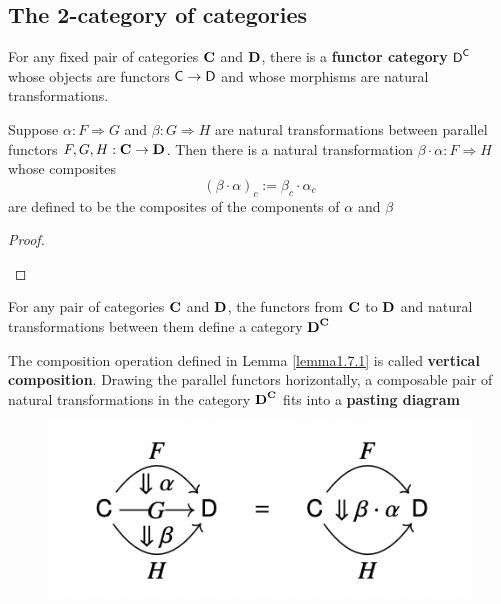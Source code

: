 \documentclass[11pt]{article}
\begin{document}
\subsection{The 2-category of categories}
\label{sec:org9f86850}
For any fixed pair of categories \(\operatorname{\textbf{C}}\) and \(\operatorname{\textbf{D}}\), there is a \textbf{functor category} \(\textsf{D}^{\textsf{C}}\)
whose objects are functors \(\textsf{C}\to\textsf{D}\) and whose morphisms are natural transformations.

\begin{lemma}
\label{lemma1.7.1}
Suppose \(\alpha:F\Rightarrow G\) and \(\beta:G\Rightarrow H\) are natural transformations between parallel
functors \(F,G,H:\operatorname{\textbf{C}}\to\operatorname{\textbf{D}}\). Then there is a natural transformation \(\beta\cdot\alpha:F\Rightarrow H\) whose composites
\begin{equation*}
(\beta\cdot\alpha)_c:=\beta_c\cdot\alpha_c
\end{equation*}
are defined to be the composites of the components of \(\alpha\) and \(\beta\)
\end{lemma}

\begin{proof}
\begin{center}\end{center}
\end{proof}

\begin{corollary}[]
For any pair of categories \(\operatorname{\textbf{C}}\) and \(\operatorname{\textbf{D}}\), the functors from \(\operatorname{\textbf{C}}\) to \(\operatorname{\textbf{D}}\) and natural
transformations between them define a category \(\operatorname{\textbf{D}}^{\operatorname{\textbf{C}}}\)
\end{corollary}

The composition operation defined in Lemma \ref{lemma1.7.1} is called \textbf{vertical composition}.
Drawing the parallel functors horizontally, a composable pair of natural transformations in the
category \(\operatorname{\textbf{D}}^{\operatorname{\textbf{C}}}\) fits into a \textbf{pasting diagram}

\begin{figure}[htbp]
\centering
\includegraphics[width=.5\textwidth]{../images/CategoryTheoryInContext/1.png}
\label{}
\end{figure}
\end{document}
